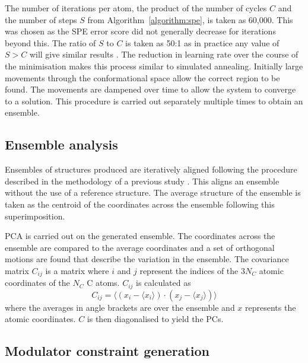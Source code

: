 The number of iterations per atom, the product of the number of cycles $C$ and the number of steps $S$ from Algorithm~\ref{algorithm:spe}, is taken as 60,000.
This was chosen as the SPE error score did not generally decrease for iterations beyond this.
The ratio of $S$ to $C$ is taken as 50:1 as in practice any value of $S > C$ will give similar results \cite{Agrafiotis2013}.
The reduction in learning rate over the course of the minimisation makes this process similar to simulated annealing.
Initially large movements through the conformational space allow the correct region to be found.
The movements are dampened over time to allow the system to converge to a solution.
This procedure is carried out separately multiple times to obtain an ensemble.


\subsection{Ensemble analysis}

Ensembles of structures produced are iteratively aligned following the procedure described in the methodology of a previous study \cite{Bakan2009}.
This aligns an ensemble without the use of a reference structure.
The average structure of the ensemble is taken as the centroid of the coordinates across the ensemble following this superimposition.

PCA is carried out on the generated ensemble.
The coordinates across the ensemble are compared to the average coordinates and a set of orthogonal motions are found that describe the variation in the ensemble.
The covariance matrix $C_{ij}$ is a matrix where $i$ and $j$ represent the indices of the $3 N_{C}$ atomic coordinates of the $N_{C}$ C\textsuperscript{\textalpha} atoms.
$C_{ij}$ is calculated as
$$
C_{ij} = \langle (x_{i} - \langle x_{i} \rangle) \cdot (x_{j} - \langle x_{j} \rangle) \rangle
$$
where the averages in angle brackets are over the ensemble and $x$ represents the atomic coordinates.
$C$ is then diagonalised to yield the PCs.


\subsection{Modulator constraint generation}

